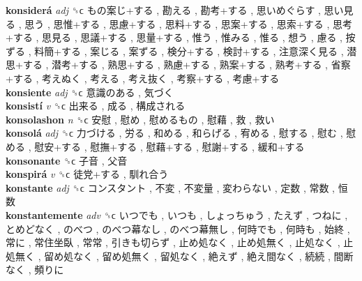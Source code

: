 \textbf{konsiderá} \emph{adj}  ␝ϲ   もの案じ+する ,  勘える ,  勘考+する ,  思いめぐらす ,  思い見る ,  思う ,  思惟+する ,  思慮+する ,  思料+する ,  思案+する ,  思索+する ,  思考+する ,  思見る ,  思議+する ,  思量+する ,  惟う ,  惟みる ,  惟る ,  想う ,  慮る ,  按ずる ,  料簡+する ,  案じる ,  案ずる ,  検分+する ,  検討+する ,  注意深く見る ,  潜思+する ,  潜考+する ,  熟思+する ,  熟慮+する ,  熟案+する ,  熟考+する ,  省察+する ,  考えぬく ,  考える ,  考え抜く ,  考察+する ,  考慮+する   \\
\textbf{konsiente} \emph{adj}  ␝ϲ   意識のある ,  気づく   \\
\textbf{konsistí} \emph{v}  ␝ϲ   出来る ,  成る ,  構成される   \\
\textbf{konsolashon} \emph{n}  ␝ϲ   安慰 ,  慰め ,  慰めるもの ,  慰藉 ,  救 ,  救い   \\
\textbf{konsolá} \emph{adj}  ␝ϲ   力づける ,  労る ,  和める ,  和らげる ,  宥める ,  慰する ,  慰む ,  慰める ,  慰安+する ,  慰撫+する ,  慰藉+する ,  慰謝+する ,  緩和+する   \\
\textbf{konsonante} ␝ϲ   子音 ,  父音   \\
\textbf{konspirá} \emph{v}  ␝ϲ   徒党+する ,  馴れ合う   \\
\textbf{konstante} \emph{adj}  ␝ϲ   コンスタント ,  不変 ,  不変量 ,  変わらない ,  定数 ,  常数 ,  恒数   \\
\textbf{konstantemente} \emph{adv}  ␝ϲ   いつでも ,  いつも ,  しょっちゅう ,  たえず ,  つねに ,  とめどなく ,  のべつ ,  のべつ幕なし ,  のべつ幕無し ,  何時でも ,  何時も ,  始終 ,  常に ,  常住坐臥 ,  常常 ,  引きも切らず ,  止め処なく ,  止め処無く ,  止処なく ,  止処無く ,  留め処なく ,  留め処無く ,  留処なく ,  絶えず ,  絶え間なく ,  続続 ,  間断なく ,  頻りに   \\
